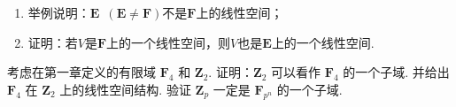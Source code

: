 \begin{exercise}
\begin{exgroup}
\begin{enumerate}
            \item 举例说明：$\mathbf{E}\enspace(\mathbf{E}\neq \mathbf{F})$不是$\mathbf{F}$上的线性空间；

            \item 证明：若$V$是$\mathbf{F}$上的一个线性空间，则$V$也是$\mathbf{E}$上的一个线性空间.
        \end{enumerate}

        \item 考虑在第一章定义的有限域 $\mathbf{F}_4$ 和 $\mathbf{Z}_2$. 证明：$\mathbf{Z}_2$ 可以看作 $\mathbf{F}_4$ 的一个子域. 并给出 $\mathbf{F}_4$ 在 $\mathbf{Z}_2$ 上的线性空间结构. 验证 $\mathbf{Z}_p$ 一定是 $\mathbf{F}_{p^n}$ 的一个子域.
    \end{exgroup}
\end{exercise}
